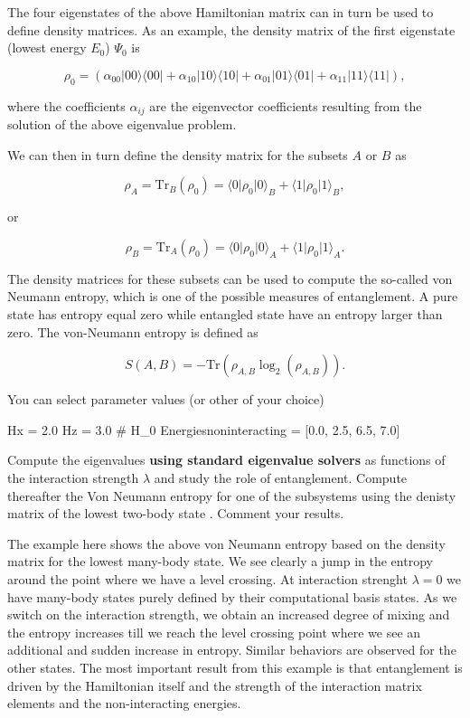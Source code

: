 \documentclass[%
oneside,                 %
final,                   %
10pt]{article}
\begin{document}
The four eigenstates of the above Hamiltonian matrix can in turn be used to
define density matrices. As an example, the density matrix of the
first eigenstate (lowest energy $E_0$) $\Psi_0$ is

\[
\rho_0=\left(\alpha_{00}\vert 00 \rangle\langle 00\vert+\alpha_{10}\vert 10 \rangle\langle 10\vert+\alpha_{01}\vert 01 \rangle\langle 01\vert+\alpha_{11}\vert 11 \rangle\langle 11\vert\right),
\]

where the coefficients $\alpha_{ij}$ are the eigenvector coefficients
resulting from the solution of the above eigenvalue problem.

We can
then in turn define the density matrix for the subsets $A$ or $B$ as

\[
\rho_A=\mathrm{Tr}_B(\rho_{0})=\langle 0 \vert \rho_{0} \vert 0\rangle_{B}+\langle 1 \vert \rho_{0} \vert 1\rangle_{B},
\]

or

\[
\rho_B=\mathrm{Tr}_A(\rho_0)=\langle 0 \vert \rho_{0} \vert 0\rangle_{A}+\langle 1 \vert \rho_{0} \vert 1\rangle_{A}.
\]

The density matrices for these subsets can be used to compute the
so-called von Neumann entropy, which is one of the possible measures
of entanglement. A pure state has entropy equal zero while entangled
state have an entropy larger than zero. The von-Neumann entropy is
defined as

\[
S(A,B)=-\mathrm{Tr}\left(\rho_{A,B}\log_2 (\rho_{A,B})\right).
\]

You can select parameter values (or other of your choice)





\begin{print}
Hx = 2.0
Hz = 3.0
# H_0
Energiesnoninteracting = [0.0, 2.5, 6.5, 7.0]

\end{print}


Compute the eigenvalues \textbf{using standard eigenvalue solvers} as functions of
the interaction strength $\lambda$ and study the role of entanglement.
Compute thereafter the Von Neumann entropy for one of the subsystems using the denisty matrix  of the lowest
two-body state . Comment your results.

The example here shows the above von Neumann entropy based on the
density matrix for the lowest many-body state. We see clearly a jump
in the entropy around the point where we have a level crossing. At
interaction strenght $\lambda=0$ we have many-body states purely
defined by their computational basis states. As we switch on the
interaction strength, we obtain an increased degree of mixing and the
entropy increases till we reach the level crossing point where we see
an additional and sudden increase in entropy. Similar behaviors are
observed for the other states. The most important result from this
example is that entanglement is driven by the Hamiltonian itself and
the strength of the interaction matrix elements and the
non-interacting energies.
\end{document}
